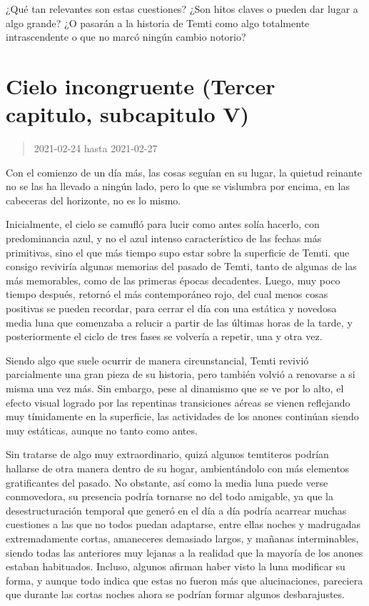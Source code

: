 \documentclass[
  spanish,
]{book}
\begin{document}
¿Qué tan relevantes son estas cuestiones? ¿Son hitos claves o pueden dar lugar a algo grande? ¿O pasarán a la historia de Temti como algo totalmente intrascendente o que no marcó ningún cambio notorio?

\hypertarget{cielo-incongruente-tercer-capitulo-subcapitulo-v}{%
\section{Cielo incongruente (Tercer capitulo, subcapitulo V)}\label{cielo-incongruente-tercer-capitulo-subcapitulo-v}}

\begin{quote}
2021-02-24 hasta 2021-02-27
\end{quote}

Con el comienzo de un día más, las cosas seguían en su lugar, la quietud reinante no se las ha llevado a ningún lado, pero lo que se vislumbra por encima, en las cabeceras del horizonte, no es lo mismo.

Inicialmente, el cielo se camufló para lucir como antes solía hacerlo, con predominancia azul, y no el azul intenso característico de las fechas más primitivas, sino el que más tiempo supo estar sobre la superficie de Temti. que consigo reviviría algunas memorias del pasado de Temti, tanto de algunas de las más memorables, como de las primeras épocas decadentes. Luego, muy poco tiempo después, retornó el más contemporáneo rojo, del cual menos cosas positivas se pueden recordar, para cerrar el día con una estática y novedosa media luna que comenzaba a relucir a partir de las últimas horas de la tarde, y posteriormente el ciclo de tres fases se volvería a repetir, una y otra vez.

Siendo algo que suele ocurrir de manera circunstancial, Temti revivió parcialmente una gran pieza de su historia, pero también volvió a renovarse a si misma una vez más. Sin embargo, pese al dinamismo que se ve por lo alto, el efecto visual logrado por las repentinas transiciones aéreas se vienen reflejando muy tímidamente en la superficie, las actividades de los anones continúan siendo muy estáticas, aunque no tanto como antes.

Sin tratarse de algo muy extraordinario, quizá algunos temtiteros podrían hallarse de otra manera dentro de su hogar, ambientándolo con más elementos gratificantes del pasado. No obstante, así como la media luna puede verse conmovedora, su presencia podría tornarse no del todo amigable, ya que la desestructuración temporal que generó en el día a día podría acarrear muchas cuestiones a las que no todos puedan adaptarse, entre ellas noches y madrugadas extremadamente cortas, amaneceres demasiado largos, y mañanas interminables, siendo todas las anteriores muy lejanas a la realidad que la mayoría de los anones estaban habituados. Incluso, algunos afirman haber visto la luna modificar su forma, y aunque todo indica que estas no fueron más que alucinaciones, pareciera que durante las cortas noches ahora se podrían formar algunos desbarajustes.
\end{document}

